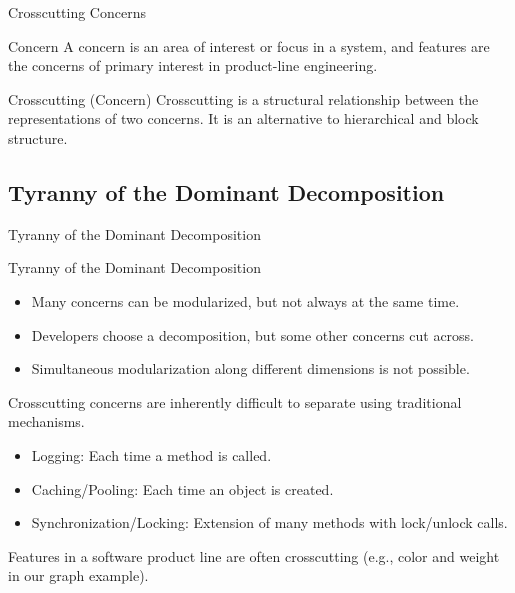 \begin{frame}{Crosscutting Concerns } %
	\begin{fancycolumns}[t]
		\begin{definition}{Concern }
			A concern is an area of interest or focus in a system, and features are the concerns of primary interest in product-line engineering.
		\end{definition}
	\nextcolumn
		\begin{definition}{Crosscutting (Concern) }
			Crosscutting is a structural relationship between the representations of two concerns. 
			It is an alternative to hierarchical and block structure.
		\end{definition}
	\end{fancycolumns}
\end{frame}

\subsection{Tyranny of the Dominant Decomposition}

\begin{frame}{Tyranny of the Dominant Decomposition } %
	\begin{fancycolumns}
		\begin{definition}{Tyranny of the Dominant Decomposition}
			\begin{itemize}
				\item Many concerns can be modularized, but not always at the same time.
				\item Developers choose a decomposition, but some other concerns cut across.
				\item Simultaneous modularization along different dimensions is not possible.
			\end{itemize}
		\end{definition}
	\nextcolumn
		\begin{note}{} %
			Crosscutting concerns are inherently difficult to separate using traditional mechanisms.
			\begin{itemize}
				\item Logging: Each time a method is called.
				\item Caching/Pooling: Each time an object is created.
				\item Synchronization/Locking: Extension of many methods with lock/unlock calls.
			\end{itemize}
			Features in a software product line are often crosscutting (e.g., color and weight in our graph example).
		\end{note}
	\end{fancycolumns}
\end{frame}

